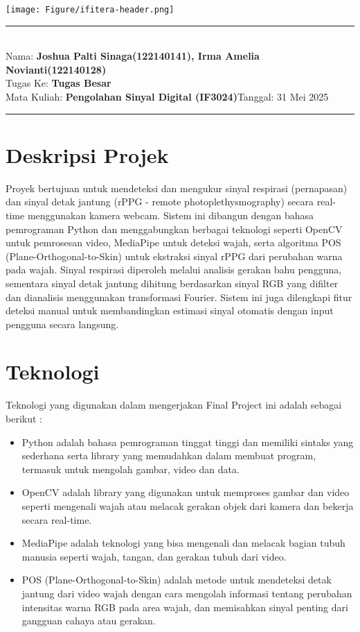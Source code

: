 \documentclass[11pt,a4paper]{article}
\newcommand{\student}{\textbf{Joshua Palti Sinaga(122140141), Irma Amelia Novianti(122140128)}}
\newcommand{\course}{\textbf{Pengolahan Sinyal Digital (IF3024)}}
\newcommand{\assignment}{\textbf{Tugas Besar}}
\begin{document}
\thispagestyle{empty}
\begin{center}
	\texttt{[image: Figure/ifitera-header.png]}
	\vspace{0.1cm}
\end{center}
\noindent
\rule{17cm}{0.2cm}\\[0.3cm]
Nama: \student \hfill \\ 
Tugas Ke: \assignment\\[0.1cm]
Mata Kuliah: \course \hfill Tanggal: 31 Mei 2025\\
\rule{17cm}{0.05cm}
\vspace{0.1cm}



\section{Deskripsi Projek}
    Proyek bertujuan untuk mendeteksi dan mengukur sinyal respirasi (pernapasan) dan sinyal detak jantung (rPPG - remote photoplethysmography) secara real-time menggunakan kamera webcam. Sistem ini dibangun dengan bahasa pemrograman Python dan menggabungkan berbagai teknologi seperti OpenCV untuk pemrosesan video, MediaPipe untuk deteksi wajah, serta algoritma POS (Plane-Orthogonal-to-Skin) untuk ekstraksi sinyal rPPG dari perubahan warna pada wajah. Sinyal respirasi diperoleh melalui analisis gerakan bahu pengguna, sementara sinyal detak jantung dihitung berdasarkan sinyal RGB yang difilter dan dianalisis menggunakan transformasi Fourier. Sistem ini juga dilengkapi fitur deteksi manual untuk membandingkan estimasi sinyal otomatis dengan input pengguna secara langsung.

\section{Teknologi}
    Teknologi yang digunakan dalam mengerjakan Final Project ini adalah sebagai berikut : 
    \begin{itemize}
        \item Python adalah bahasa pemrograman tinggat tinggi dan memiliki sintaks yang sederhana serta library yang memudahkan dalam membuat program, termasuk untuk mengolah gambar, video dan data.
        \item OpenCV adalah library yang digunakan untuk memproses gambar dan video seperti mengenali wajah atau melacak gerakan objek dari kamera dan bekerja secara real-time.
        \item MediaPipe adalah teknologi yang bisa mengenali dan melacak bagian tubuh manusia seperti wajah, tangan, dan gerakan tubuh dari video.
        \item POS (Plane-Orthogonal-to-Skin) adalah metode untuk mendeteksi detak jantung dari video wajah dengan cara mengolah informasi tentang perubahan intensitas warna RGB pada area wajah, dan memisahkan sinyal penting dari gangguan cahaya atau gerakan.
    \end{itemize}
\end{document}
